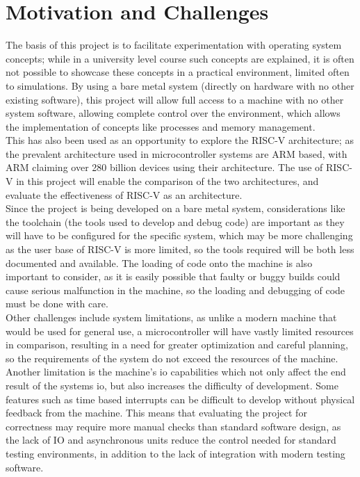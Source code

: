 \section{Motivation and Challenges}
The basis of this project is to facilitate experimentation with operating system concepts; while in a university level course such concepts are explained, it is often not possible to showcase these concepts in a practical environment, limited often to simulations. By using a bare metal system (directly on hardware with no other existing software), this project will allow full access to a machine with no other system software, allowing complete control over the environment, which allows the implementation of concepts like processes and memory management. \\
This has also been used as an opportunity to explore the RISC-V architecture; as the prevalent architecture used in microcontroller systems are ARM based, with ARM claiming over 280 billion devices using their architecture\cite{arm_info}. The use of RISC-V in this project will enable the comparison of the two architectures, and evaluate the effectiveness of RISC-V as an architecture.\\
Since the project is being developed on a bare metal system, considerations like the toolchain (the tools used to develop and debug code) are important as they will have to be configured for the specific system, which may be more challenging as the user base of RISC-V is more limited, so the tools required will be both less documented and available. The loading of code onto the machine is also important to consider, as it is easily possible that faulty or buggy builds could cause serious malfunction in the machine, so the loading and debugging of code must be done with care.\\
Other challenges include system limitations, as unlike a modern machine that would be used for general use, a microcontroller will have vastly limited resources in comparison, resulting in a need for greater optimization and careful planning, so the requirements of the system do not exceed the resources of the machine. Another limitation is the machine's \ac{io} capabilities which not only affect the end result of the systems \ac{io}, but also increases the difficulty of development. Some features such as time based interrupts can be difficult to develop without physical feedback from the machine. This means that evaluating the project for correctness may require more manual checks than standard software design, as the lack of IO and asynchronous units reduce the control needed for standard testing environments, in addition to the lack of integration with modern testing software.


